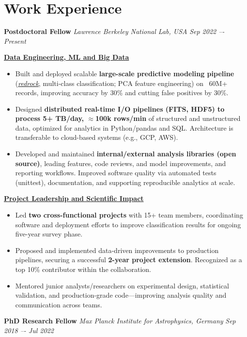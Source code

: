 \documentclass[a4paper,10pt]{article}
\begin{document}
\section*{Work Experience}
\textcolor{sectionblue}{\textbf{Postdoctoral Fellow}} \hfill
\textcolor{sectionblue}{\textit{Lawrence Berkeley National Lab, USA}} \hfill
\textcolor{sectionblue}{\textit{Sep 2022 –- Present}}
\vspace{1.5mm}
\begin{adjustwidth}{1em}{0pt}

\textcolor{sectionblue}{\textbf{\underline{Data Engineering, ML and Big Data}}}
\begin{itemize}[leftmargin=*, itemsep=2pt]
    \item Built and deployed scalable \textbf{large-scale predictive modeling pipeline} (\href{https://github.com/desihub/redrock}{\textit{redrock}}, multi-class classification; PCA feature engineering) on ~60M+ records, improving accuracy by 30\% and cutting false positives by 30\%.
    \item Designed \textbf{distributed real-time I/O pipelines (FITS, HDF5) to process 5+ TB/day, $\approx$100k rows/min} of structured and unstructured data, optimized for analytics in Python/pandas and SQL. Architecture is transferable to cloud-based systems (e.g., GCP, AWS).
    \item Developed and maintained \textbf{internal/external analysis libraries (open source)}, leading features, code reviews, and model improvements, and reporting workflows. Improved software quality via automated tests (unittest), documentation, and supporting reproducible analytics at scale.
\end{itemize}
\vspace{-0.5pt}
\textcolor{sectionblue}{\textbf{\underline{Project Leadership and Scientific Impact}}}
\begin{itemize}[leftmargin=*, itemsep=2pt]
    \item Led \textbf{two cross-functional projects} with 15+ team members, coordinating software and deployment efforts to improve classification results for ongoing five-year survey phase.
    \item Proposed and implemented data-driven improvements to production pipelines, securing a successful \textbf{2-year project extension}. Recognized as a top 10\% contributor within the collaboration.
    \item Mentored junior analysts/researchers on experimental design, statistical validation, and production-grade code—improving analysis quality and communication across teams.
\end{itemize}
\end{adjustwidth}
\vspace{2mm}
\textcolor{sectionblue}{\textbf{PhD Research Fellow}} \hfill
\textcolor{sectionblue}{\textit{Max Planck Institute for Astrophysics, Germany}} \hfill
\textcolor{sectionblue}{\textit{Sep 2018 –- Jul 2022}}
\end{document}
